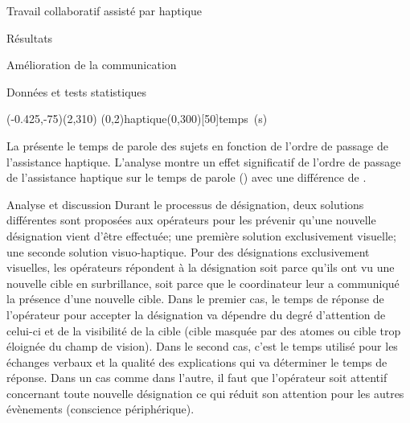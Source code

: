 \documentclass[myfrancais,ngerman,english,french]{mythesis}
\begin{document}
\begin{mychapter}{Travail collaboratif assisté par haptique}
\begin{mysection}{Résultats}
\begin{mysubsection}{Amélioration de la communication}
\begin{mysubsubsection}{Données et tests statistiques}
					\begin{myfigure}
						\begin{myps}(-0.425,-75)(2,310)
							\myaxes(0,2){haptique}(0,300)[50]{temps~(s)}
						\end{myps}
					\end{myfigure}

					La  présente le temps de parole des sujets  en fonction de l'ordre de passage de l'assistance haptique.
					L'analyse montre un effet significatif de l'ordre de passage de l'assistance haptique sur le temps de parole  () avec une différence de .
				\end{mysubsubsection}
				\begin{mysubsubsection}{Analyse et discussion}
					Durant le processus de désignation, deux solutions différentes sont proposées aux opérateurs pour les prévenir qu'une nouvelle désignation vient d'être effectuée; une première solution exclusivement visuelle; une seconde solution visuo-haptique.
					Pour des désignations exclusivement visuelles, les opérateurs répondent à la désignation soit parce qu'ils ont vu une nouvelle cible en surbrillance, soit parce que le coordinateur leur a communiqué la présence d'une nouvelle cible.
					Dans le premier cas, le temps de réponse de l'opérateur pour accepter la désignation va dépendre du degré d'attention de celui-ci et de la visibilité de la cible (cible masquée par des atomes ou cible trop éloignée du champ de vision).
					Dans le second cas, c'est le temps utilisé pour les échanges verbaux et la qualité des explications qui va déterminer le temps de réponse.
					Dans un cas comme dans l'autre, il faut que l'opérateur soit attentif concernant toute nouvelle désignation ce qui réduit son attention pour les autres évènements (conscience périphérique).


\end{mysubsubsection}
\end{mysubsection}
\end{mysection}
\end{mychapter}
\end{document}
